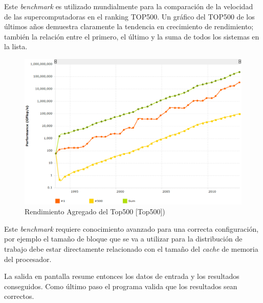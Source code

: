 \documentclass[a4paper]{report}
\begin{document}
\bigskip

Este {\it benchmark} es utilizado mundialmente para la comparación de la
velocidad de las supercomputadoras en el ranking TOP500. 
Un gráfico del TOP500 de los últimos años demuestra claramente la
tendencia en crecimiento de rendimiento; también la relación entre el primero,
el último y la suma de todos los sistemas en la lista.

\begin{figure}[H]
\centering
\includegraphics[width=12cm]{top500.png}
\caption{Rendimiento Agregado del Top500 [Top500])}
\label{fig:top500}
\end{figure}

Este {\it benchmark} requiere conocimiento avanzado para una correcta configuración,
por ejemplo el tamaño de bloque que se va a utilizar para la distribución de trabajo
debe estar directamente relacionado con el tamaño del {\it cache} de memoria del procesador.

\bigskip

La salida en pantalla resume entonces los datos de entrada y los resultados conseguidos.
Como último paso el programa valida que los resultados sean correctos.
\end{document}
